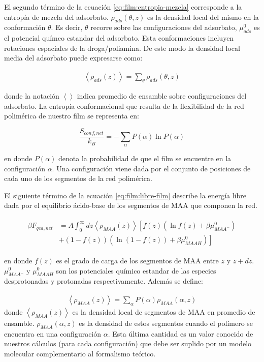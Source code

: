 El segundo t\'ermino de la ecuaci\'on \ref{eq:film:entropia-mezcla} corresponde a la entrop\'ia de mezcla del adsorbato. $\rho_{ads}(\theta,z)$ es la densidad local del mismo en la conformaci\'on $\theta$. Es decir, $\theta$ recorre sobre las configuraciones del adsorbato, $\mu^0_{ads}$ es el potencial qu\'imco estandar del adsorbato.
Esta conformaciones incluyen rotaciones espaciales de la droga/poliamina.
De este modo la densidad local media del adsorbato  puede expresarse como:


\begin{align}
	\left<\rho_{ads}(z)\right> = \sum_\theta{\rho_{ads}(\theta,z)}
	\label{eq:film:ads-z-theta}
\end{align}

\noindent donde la notaci\'on $\left< \right> $ indica promedio de ensamble sobre configuraciones del adsorbato.
La entrop\'ia conformacional que resulta de la flexibilidad de la red polim\'erica de nuestro film se representa en:

\begin{equation}
	\frac{S_{conf,net}}{k_B} = - \sum_{\alpha}{P(\alpha)\ln P(\alpha)}
\end{equation}

\noindent en donde $P(\alpha)$ denota la probabilidad de que el film se encuentre en la configuraci\'on $\alpha$. Una configuraci\'on viene dada por el conjunto de posiciones de cada uno de los segmentos de la red polim\'erica. 

El siguiente t\'ermino de la ecuaci\'on \ref{eq:film:libre-film} describe  la energ\'ia libre dada por  el equilibrio \'acido-base de los segmentos de MAA que componen la red. 

\begin{align}
	\begin{aligned}
		\beta F_{qca,net} &= A\int_0^\infty dz \left<\rho_{MAA}(z)\right> \left[f(z)(\ln f(z)+ \beta\mu^0_{MAA^-})\right.\\
		&\left.+(1-f(z))(\ln (1-f(z))+\beta\mu^0_{MAAH})\right]    
	\end{aligned}
\end{align} 

\noindent en donde $f(z)$ es el grado de carga de los segmentos de MAA entre  $z$ y $z + dz$. 
$\mu^0_{MAA^-}$ y $\mu^0_{MAAH}$ son los potenciales qu\'imico estandar  de las especies  desprotonadas y protonadas respectivamente.
Adem\'as se define:

\begin{align}
	\left< \rho_{MAA}(z)\right> = \sum_\alpha{P(\alpha)\rho_{MAA}(\alpha,z)}
\end{align}
\noindent donde $\left< \rho_{MAA}(z)\right>$ es la densidad local de segmentos de MAA en promedio de ensamble. $\rho_{MAA}(\alpha,z)$ es la densidad de estos segmentos cuando el pol\'imero se encuentra en una configuraci\'on $\alpha$. Esta \'ultima cantidad es un valor conocido de nuestros c\'alculos (para cada configuraci\'on) que debe ser suplido por un modelo molecular complementario al formalismo te\'orico.


